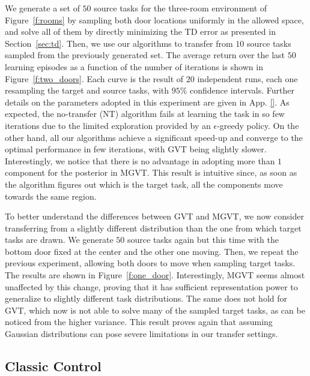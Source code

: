 \documentclass{article}
\begin{document}
We generate a set of $50$ source tasks for the three-room environment of Figure~\ref{f:rooms} by sampling both door locations uniformly in the allowed space, and solve all of them by directly minimizing the TD error as presented in Section~\ref{sec:td}. Then, we use our algorithms to transfer from $10$ source tasks sampled from the previously generated set. The average return over the last $50$ learning episodes as a function of the number of iterations is shown in Figure~\ref{f:two_doors}. Each curve is the result of $20$ independent runs, each one resampling the target and source tasks, with $95\%$ confidence intervals. Further details on the parameters adopted in this experiment are given in App. \ref{}. As expected, the no-transfer (NT) algorithm fails at learning the task in so few iterations due to the limited exploration provided by an $\epsilon$-greedy policy. On the other hand, all our algorithms achieve a significant speed-up and converge to the optimal performance in few iterations, with GVT being slightly slower. Interestingly, we notice that there is no advantage in adopting more than $1$ component for the posterior in MGVT. This result is intuitive since, as soon as the algorithm figures out which is the target task, all the components move towards the same region.

To better understand the differences between GVT and MGVT, we now consider transferring from a slightly different distribution than the one from which target tasks are drawn. We generate $50$ source tasks again but this time with the bottom door fixed at the center and the other one moving. Then, we repeat the previous experiment, allowing both doors to move when sampling target tasks. The results are shown in Figure~\ref{f:one_door}. Interestingly, MGVT seems almost unaffected by this change, proving that it has sufficient representation power to generalize to slightly different task distributions. The same does not hold for GVT, which now is not able to solve many of the sampled target tasks, as can be noticed from the higher variance. This result proves again that assuming Gaussian distributions can pose severe limitations in our transfer settings.

\subsection{Classic Control} \label{sec:cc}
\end{document}
